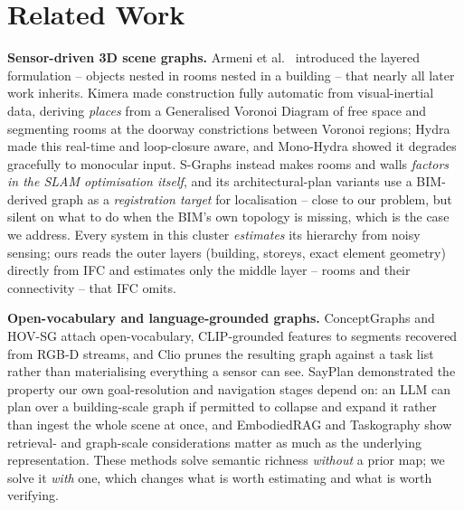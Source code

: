 \documentclass[a4paper, 10pt, conference]{ieeeconf}
\begin{document}
\section{Related Work}
\label{sec:related}

\textbf{Sensor-driven 3D scene graphs.} Armeni et al.\ \cite{armeni20193d} introduced the layered formulation -- objects nested in rooms nested in a building -- that nearly all later work inherits. Kimera \cite{rosinol2021kimera} made construction fully automatic from visual-inertial data, deriving \emph{places} from a Generalised Voronoi Diagram of free space and segmenting rooms at the doorway constrictions between Voronoi regions; Hydra \cite{hughes2022hydra} made this real-time and loop-closure aware, and Mono-Hydra \cite{udugama2023monohydra} showed it degrades gracefully to monocular input. S-Graphs \cite{bavle2022sgraphsplus,bavle2025sgraphs2} instead makes rooms and walls \emph{factors in the SLAM optimisation itself}, and its architectural-plan variants \cite{shaheer2023architectural,ndulue2026matching} use a BIM-derived graph as a \emph{registration target} for localisation -- close to our problem, but silent on what to do when the BIM's own topology is missing, which is the case we address. Every system in this cluster \emph{estimates} its hierarchy from noisy sensing; ours reads the outer layers (building, storeys, exact element geometry) directly from IFC and estimates only the middle layer -- rooms and their connectivity -- that IFC omits.

\textbf{Open-vocabulary and language-grounded graphs.} ConceptGraphs \cite{gu2023conceptgraphs} and HOV-SG \cite{werby2024hovsg} attach open-vocabulary, CLIP-grounded features to segments recovered from RGB-D streams, and Clio \cite{maggio2024clio} prunes the resulting graph against a task list rather than materialising everything a sensor can see. SayPlan \cite{rana2023sayplan} demonstrated the property our own goal-resolution and navigation stages depend on: an LLM can plan over a building-scale graph if permitted to collapse and expand it rather than ingest the whole scene at once, and EmbodiedRAG \cite{booker2024embodiedrag} and Taskography \cite{agia2022taskography} show retrieval- and graph-scale considerations matter as much as the underlying representation. These methods solve semantic richness \emph{without} a prior map; we solve it \emph{with} one, which changes what is worth estimating and what is worth verifying.
\end{document}
